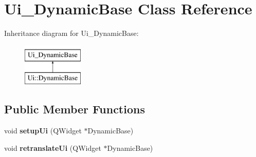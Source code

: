 \hypertarget{class_ui___dynamic_base}{}\section{Ui\+\_\+\+Dynamic\+Base Class Reference}
\label{class_ui___dynamic_base}
Inheritance diagram for Ui\+\_\+\+Dynamic\+Base\+:\begin{figure}[H]
\begin{center}
\leavevmode
\includegraphics[height=2.000000cm]{class_ui___dynamic_base}
\end{center}
\end{figure}
\subsection*{Public Member Functions}
\begin{DoxyCompactItemize}
\item 
\mbox{\label{class_ui___dynamic_base_aba7fb20aea6bb17655b45b1855ca604f}} 
void {\bfseries setup\+Ui} (Q\+Widget $\ast$Dynamic\+Base)
\item 
\mbox{\label{class_ui___dynamic_base_a01930f21c22cc13b544c59114fde056a}} 
void {\bfseries retranslate\+Ui} (Q\+Widget $\ast$Dynamic\+Base)
\end{DoxyCompactItemize}
